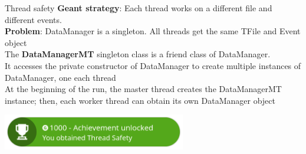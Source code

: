 \documentclass[8pt]{beamer}
\begin{document}
\begin{frame}[fragile]{Thread safety}
\textbf{Geant strategy}: Each thread works on a different file and different events.\\
\vspace{0.2cm}
\textbf{Problem}: DataManager is a singleton. All threads get the same TFile and Event object\\
\vspace{0.8cm}
The \textbf{DataManagerMT} singleton class is a friend class of DataManager.\\
\vspace{0.3cm}
It accesses the private constructor of DataManager to create multiple instances of DataManager, one each thread\\
\vspace{0.3cm}
At the beginning of the run, the master thread creates the DataManagerMT instance; then, each worker thread can obtain its own DataManager object\\
\vspace{0.6cm}
\begin{center}
    \includegraphics[width=0.6\textwidth]{img/achievement.png}
\end{center}
\end{frame}
\end{document}
